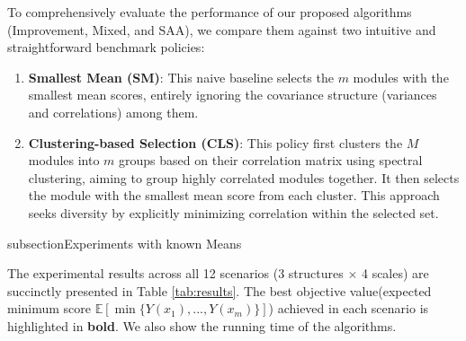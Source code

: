 \documentclass[opre,sglanonrev]{informs4}
\begin{document}
To comprehensively evaluate the performance of our proposed algorithms (Improvement, Mixed, and SAA), we compare them against two intuitive and straightforward benchmark policies:

\begin{enumerate}
    \item \textbf{Smallest Mean (SM)}: This naive baseline selects the $m$ modules with the smallest mean scores, entirely ignoring the covariance structure (variances and correlations) among them.
    \item \textbf{Clustering-based Selection (CLS)}: This policy first clusters the $M$ modules into $m$ groups based on their correlation matrix using spectral clustering, aiming to group highly correlated modules together. It then selects the module with the smallest mean score from each cluster. This approach seeks diversity by explicitly minimizing correlation within the selected set.
\end{enumerate}

subsection{Experiments with known Means}
\label{sec:known_means}

The experimental results across all 12 scenarios (3 structures $\times$ 4 scales) are succinctly presented in Table \ref{tab:results}. The best objective value(expected minimum score $\mathbb{E}[\min\{Y(x_1), ..., Y(x_m)\}]$) achieved in each scenario is highlighted in \textbf{bold}. We also show the running time of the algorithms. 
\end{document}
